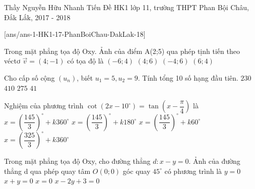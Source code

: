 \begin{name}
{Thầy Nguyễn Hữu Nhanh Tiến}
{Đề HK1 lớp 11, trường THPT Phan Bội Châu, Đắk Lắk, 2017 - 2018}
\end{name}
\setcounter{ex}{0}\setcounter{bt}{0}
[ans/ans-1-HK1-17-PhanBoiChau-DakLak-18]
\begin{ex} %
	Trong mặt phẳng tọa độ Oxy. Ảnh của điểm A(2;5) qua phép tịnh tiến theo véctơ $\vec{v}=\left({4;-1}\right)$ có tọa độ là
	\choice
	{$\left({-6;4}\right)$	}
	{$\left({4;6}\right)$	}
	{$\left({-4;6}\right)$	}
	{\True $\left({6;4}\right)$}
\end{ex}
\begin{ex} %
	Cho cấp số cộng $\left({u_n}\right)$, biết $u_1=5,u_2=9$. Tính tổng 10 số hạng đầu tiên.
\choice
	{\True $230$}
	{$410$}
	{$275$}
	{$41$}
\end{ex}
\begin{ex} %
	Nghiệm của phương trình $\cot \left({2x-{10}^\circ}\right)=\tan \left({x-\dfrac{\pi}{4}}\right)$ là
	\choice
	{$x=\left({\dfrac{145}{3}}\right)^\circ+k360^\circ$}
	{$x=\left({\dfrac{145}{3}}\right)^\circ+k180^\circ$}
	{\True $x=\left({\dfrac{145}{3}}\right)^\circ+k60^\circ$}
	{$x=\left({\dfrac{325}{3}}\right)^\circ+k360^\circ$}
\end{ex}
\begin{ex} %
	Trong mặt phẳng tọa độ Oxy, cho đường thẳng $d: x - y = 0$. Ảnh của đường thẳng d qua phép quay tâm $O\left({0;0}\right)$ góc quay $45^\circ$ có phương trình là
	\choice
	{$y=0$}
	{$x+y=0$}
	{\True $x=0$}
	{$x-2y+3=0$}
\end{ex}
